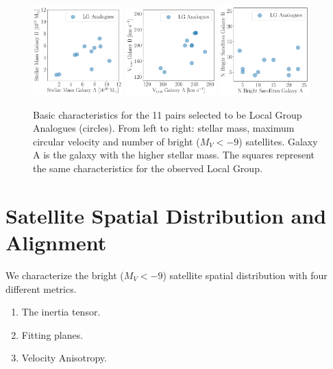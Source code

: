 \documentclass[a4paper,fleqn,usenatbib]{mnras}
\begin{document}
\begin{figure}
\centering
\includegraphics[width=0.31\textwidth]{mstar.pdf}
\includegraphics[width=0.31\textwidth]{vmax.pdf}
\includegraphics[width=0.31\textwidth]{nsat.pdf}
\caption{Basic characteristics for the 11 pairs selected to be Local
  Group Analogues (circles). From left to right: stellar mass, maximum circular
  velocity and number of bright ($M_V<-9$) satellites.
  Galaxy A is the galaxy with the higher stellar mass.
  The squares represent the same characteristics for the observed
  Local Group. 
\label{fig:general}}
\end{figure}




\section{Satellite Spatial Distribution and Alignment}
\label{sec:SpatialMeasurements}

We characterize the bright ($M_V<-9$) satellite spatial distribution
with four different metrics. 

\begin{enumerate}
\item{The inertia tensor}.
\item{Fitting planes}.
\item{Velocity Anisotropy}.
\end{enumerate}
\end{document}
